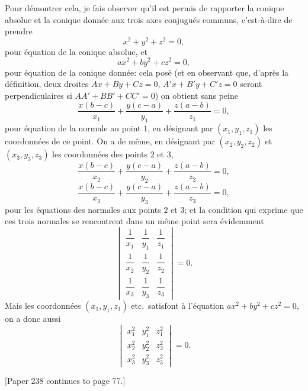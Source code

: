 \documentclass[11pt,a4paper]{article}
\begin{document}
Pour d\'emontrer cela, je fais observer qu'il est permis de rapporter la conique
absolue et la conique donn\'ee aux trois axes conjugu\'es communs, c'est-\`a-dire
de prendre
\[
x^{2} + y^{2} + z^{2} = 0,
\]
pour \'equation de la conique absolue, et
\[
ax^{2} + by^{2} + cz^{2} = 0,
\]
pour \'equation de la conique donn\'ee: cela pos\'e (et en observant que, d'apr\`es
la d\'efinition, deux droites $Ax + By + Cz = 0$, $A'x + B'y + C'z = 0$ seront
perpendiculaires si $AA' + BB' + CC' = 0$) on obtient sans peine
\[
\frac{x(b-c)}{x_{1}} + \frac{y(c-a)}{y_{1}} + \frac{z(a-b)}{z_{1}} = 0,
\]
pour \'equation de la normale au point $1$, en d\'esignant par $(x_{1}, y_{1}, z_{1})$
les coordonn\'ees de ce point. On a de m\^eme, en d\'esignant par
$(x_{2}, y_{2}, z_{2})$ et $(x_{3}, y_{3}, z_{3})$ les coordonn\'ees des points
$2$ et $3$,
\[
\frac{x(b-c)}{x_{2}} + \frac{y(c-a)}{y_{2}} + \frac{z(a-b)}{z_{2}} = 0,
\]
\[
\frac{x(b-c)}{x_{3}} + \frac{y(c-a)}{y_{3}} + \frac{z(a-b)}{z_{3}} = 0,
\]
pour les \'equations des normales aux points $2$ et $3$; et la condition qui
exprime que ces trois normales se rencontrent dans un m\^eme point sera
\'evidemment
\[
\begin{vmatrix}
\dfrac{1}{x_{1}} & \dfrac{1}{y_{1}} & \dfrac{1}{z_{1}} \\[0.5em]
\dfrac{1}{x_{2}} & \dfrac{1}{y_{2}} & \dfrac{1}{z_{2}} \\[0.5em]
\dfrac{1}{x_{3}} & \dfrac{1}{y_{3}} & \dfrac{1}{z_{3}}
\end{vmatrix} = 0.
\]
Mais les coordonn\'ees $(x_{1}, y_{1}, z_{1})$ etc.\ satisfont \`a l'\'equation
$a x^{2} + b y^{2} + c z^{2} = 0$, on a donc aussi
\[
\begin{vmatrix}
x_{1}^{2} & y_{1}^{2} & z_{1}^{2} \\
x_{2}^{2} & y_{2}^{2} & z_{2}^{2} \\
x_{3}^{2} & y_{3}^{2} & z_{3}^{2}
\end{vmatrix} = 0.
\]

[Paper 238 continues to page 77.]
\end{document}
